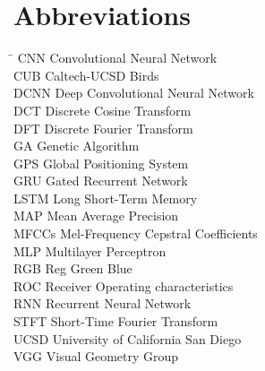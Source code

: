 


\chapter*{Abbreviations}
\begin{tabbing}
\hspace{50mm}\=\kill
CNN \> Convolutional Neural Network\\
CUB \> Caltech-UCSD Birds\\
DCNN \> Deep Convolutional Neural Network\\
DCT \> Discrete Cosine Transform\\
DFT \> Discrete Fourier Transform\\
GA \> Genetic Algorithm\\
GPS \> Global Positioning System\\
GRU \> Gated Recurrent Network\\
LSTM \> Long Short-Term Memory\\
MAP \> Mean Average Precision\\
MFCCs \> Mel-Frequency Cepstral Coefficients\\
MLP \> Multilayer Perceptron\\
RGB \> Reg Green Blue\\
ROC \> Receiver Operating characteristics\\
RNN \> Recurrent Neural Network\\
STFT \> Short-Time Fourier Transform\\
UCSD \> University of California San Diego\\
VGG \> Visual Geometry Group\\
\end{tabbing}
\newpage
{}

